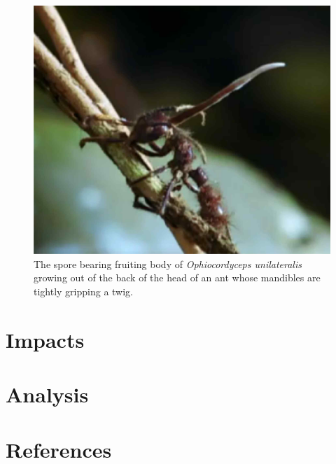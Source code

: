 \documentclass[twocolumn]{article}
\begin{document}
\begin{figure}[!ht]
    \centering
    \includegraphics[width=.4\textwidth]{images/cordyceps_ant.jpg}
    \caption{The spore bearing fruiting body of \textit{Ophiocordyceps unilateralis} growing out of the back of the head of an ant whose mandibles are tightly gripping a twig. }
    \label{fig:cordyceps_ant}
\end{figure}

\section*{Impacts}

\section*{Analysis}

\section*{References}

\printbibliography
\end{document}
